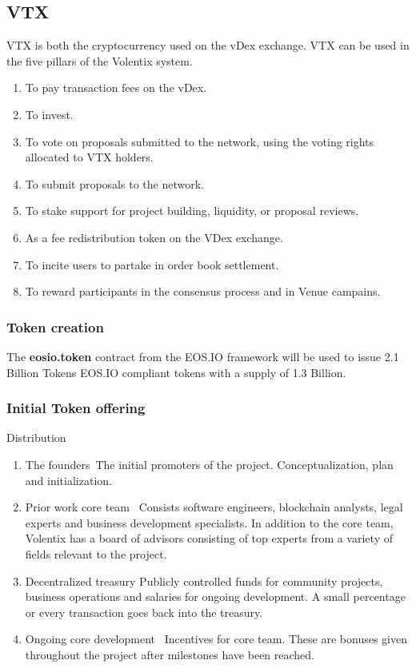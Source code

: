 \documentclass[]{article}
\begin{document}
\subsection{VTX}
VTX is both the cryptocurrency used on the vDex exchange. 
VTX can be used in the five pillars of the Volentix system.

\begin{enumerate}
\item To pay transaction fees on the vDex.
\item To invest. 
\item To vote on proposals submitted to the network, using the voting rights allocated to VTX holders.
\item To submit proposals to the network.
\item To stake support for project building, liquidity, or proposal reviews. 
\item As a fee redistribution token on the VDex exchange.
\item To incite users to partake in order book settlement.
\item To reward participants in the consensus process and in Venue campains.
\end{enumerate}



\subsubsection{Token creation}
The \textbf{eosio.token} contract from the EOS.IO framework will be used to issue 2.1 Billion Tokens EOS.IO compliant tokens with a supply of 1.3 Billion.
 

 
\subsubsection{Initial Token offering}
 
Distribution
\begin{enumerate}
\item The founders\
The initial promoters of the project. 
Conceptualization, plan and initialization.	
\item Prior work core team \
Consists software engineers, blockchain analysts, legal experts and business development specialists. 
In addition to the core team, Volentix has a board of advisors consisting of top experts from a variety of fields relevant to the project.
\item Decentralized treasury
Publicly controlled funds for community projects, business operations and salaries for ongoing development. A small percentage or every transaction goes back into the treasury.
\item Ongoing core development \
Incentives for core team. These are bonuses given throughout the project after milestones have been reached.
\end{enumerate}
	
\end{document}
